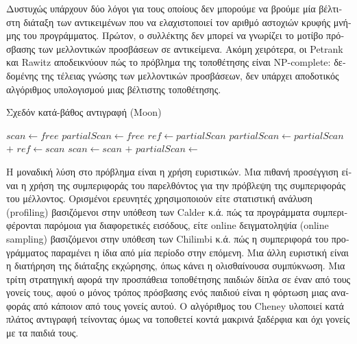 \begin{greek}
Δυστυχώς υπάρχουν δύο λόγοι για τους οποίους δεν μπορούμε να
βρούμε μία βέλτιστη διάταξη των αντικειμένων που να ελαχιστοποιεί
τον αριθμό αστοχιών κρυφής μνήμης του προγράμματος. Πρώτον, ο
συλλέκτης δεν μπορεί να γνωρίζει το μοτίβο πρόσβασης των μελλοντικών
προσβάσεων σε αντικείμενα. Ακόμη χειρότερα, οι Petrank και Rawitz
\cite{DBLP:conf/popl/PetrankR02} αποδεικνύουν πώς το πρόβλημα της τοποθέτησης είναι NP-complete:
δεδομένης της τέλειας γνώσης των μελλοντικών προσβάσεων, δεν
υπάρχει αποδοτικός αλγόριθμος υπολογισμού μιας βέλτιστης τοποθέτησης.

\begin{algorithm}
  \caption{Σχεδόν κατά-βάθος αντιγραφή (Moon)}
  \label{alg:c_4}
  \begin{algorithmic}[1]
      \State $scan \gets free$
      \State $partialScan \gets free$
    \EndProcedure
    \Statex
      \State {} 
    \EndProcedure
    \Statex
        \State $ref \gets partialScan$ 
        \State $partialScan \gets partialScan$ $+$ 
      \Else
        \State $ref \gets scan$ 
        \State $scan \gets scan$ $+$ 
      \EndIf
      \State {}
    \EndProcedure
    \Statex
     
      \State $partialScan \gets$ 
    \EndProcedure
  \end{algorithmic}
\end{algorithm}

Η μοναδική λύση στο πρόβλημα είναι η χρήση ευριστικών. Μια πιθανή
προσέγγιση είναι η χρήση της συμπεριφοράς του παρελθόντος για την
πρόβλεψη της συμπεριφοράς του μέλλοντος. Ορισμένοι ερευνητές 
χρησιμοποιούν είτε στατιστική ανάλυση (profiling) βασιζόμενοι στην υπόθεση
των Calder κ.ά. \cite{DBLP:conf/asplos/CalderKJA98} πώς τα προγράμματα συμπεριφέρονται παρόμοια
για διαφορετικές εισόδους, είτε online δειγματοληψία (online sampling)
βασιζόμενοι στην υπόθεση των Chilimbi κ.ά. \cite{DBLP:conf/pldi/ChilimbiHL99}
πώς η συμπεριφορά του προγράμματος παραμένει η ίδια από μία
περίοδο στην επόμενη. Μια άλλη ευριστική είναι η διατήρηση της
διάταξης εκχώρησης, όπως κάνει η ολισθαίνουσα συμπύκνωση. Μια
τρίτη στρατηγική αφορά την προσπάθεια τοποθέτησης παιδιών δίπλα
σε έναν από τους γονείς τους, αφού ο μόνος τρόπος πρόσβασης ενός
παιδιού είναι η φόρτωση μιας αναφοράς από κάποιον από τους γονείς
αυτού. Ο αλγόριθμος του Cheney υλοποιεί κατά πλάτος αντιγραφή
τείνοντας όμως να τοποθετεί κοντά μακρινά ξαδέρφια και όχι γονείς
με τα παιδιά τους.


\end{greek}
